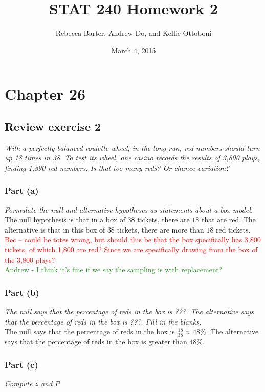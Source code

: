 \documentclass[11pt]{article}
\title{STAT 240 Homework 2}
\author{Rebecca Barter, Andrew Do, and Kellie Ottoboni}
\date{March 4, 2015} %
\begin{document}
\maketitle


\section*{Chapter 26}
\subsection*{Review exercise 2} %
\noindent \emph{With a perfectly balanced roulette wheel, in the long run, red numbers should turn up 18 times in 38. To test its wheel, one casino records the results of 3,800 plays, finding 1,890 red numbers. Is that too many reds? Or chance variation?}
\subsubsection*{Part (a)}
\noindent \emph{Formulate the null and alternative hypotheses as statements about a box model.}\\

\noindent The null hypothesis is that in a box of $38$ tickets, there are $18$ that are red.  The alternative is that in this box of $38$ tickets, there are more than $18$ red tickets.\\
\textcolor{red}{Bec -- could be totes wrong, but should this be that the box specifically has 3,800 tickets, of which 1,800 are red? Since we are specifically drawing from the box of the 3,800 plays?}\\
\textcolor{ForestGreen}{Andrew - I think it's fine if we say the sampling is with replacement?}

\subsubsection*{Part (b)}
\noindent \emph{The null says that the percentage of reds in the box is ???. The alternative says that the percentage of reds in the box is ???. Fill in the blanks.}\\

\noindent The null says that the percentage of reds in the box is $\frac{18}{38}\approx 48\%$.  The alternative says that the percentage of reds in the box is greater than $48\%$.
\subsubsection*{Part (c)}
\noindent \emph{Compute $z$ and $P$}\\
\end{document}
